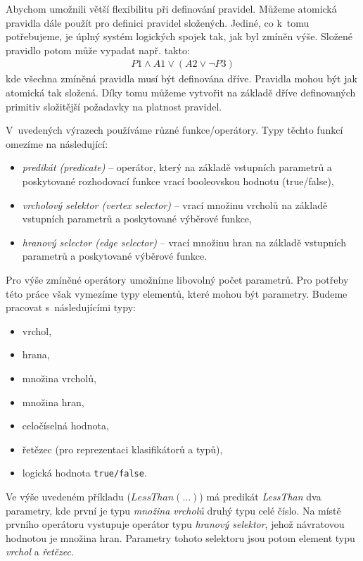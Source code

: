 Abychom umožnili větší flexibilitu při definování pravidel. Můžeme atomická pravidla dále použít pro definici pravidel složených. Jediné, co k~tomu potřebujeme, je úplný systém logických spojek tak, jak byl zmíněn výše. Složené pravidlo potom může vypadat např. takto:
\begin{align*}
P1 \wedge A1 \vee ( A2 \vee \neg P3)
\end{align*}
kde všechna zmíněná pravidla musí být definována dříve. Pravidla mohou být jak atomická tak složená. Díky tomu můžeme vytvořit na základě dříve definovaných primitiv složitější požadavky na platnost pravidel.

V~uvedených výrazech používáme různé funkce/operátory. Typy těchto funkcí omezíme na následující:

\begin{itemize}
\item \emph{predikát (predicate)} -- operátor, který na základě vstupních parametrů a poskytované rozhodovací funkce vrací booleovskou hodnotu (true/false),
\item \emph{vrcholový selektor (vertex selector)} -- vrací množinu vrcholů na základě vstupních parametrů a poskytované výběrové funkce,
\item \emph{hranový selector (edge selector)} -- vrací množinu hran na základě vstupních parametrů a poskytované výběrové funkce.
\end{itemize}
Pro výše zmíněné operátory umožníme libovolný počet parametrů. Pro potřeby této práce však vymezíme typy elementů, které mohou být parametry. Budeme pracovat s~následujícími typy:

\begin{itemize}
\item vrchol,
\item hrana,
\item množina vrcholů,
\item množina hran,
\item celočíselná hodnota,
\item řetězec (pro reprezentaci klasifikátorů a typů),
\item logická hodnota \verb-true/false-.
\end{itemize}

Ve výše uvedeném příkladu ($LessThan(...)$) má predikát \emph{LessThan} dva parametry, kde první je typu \emph{množina vrcholů} druhý typu celé číslo. Na místě prvního operátoru vystupuje operátor typu \emph{hranový selektor}, jehož návratovou hodnotou je množina hran. Parametry tohoto selektoru jsou potom element typu \emph{vrchol} a \emph{řetězec}.

